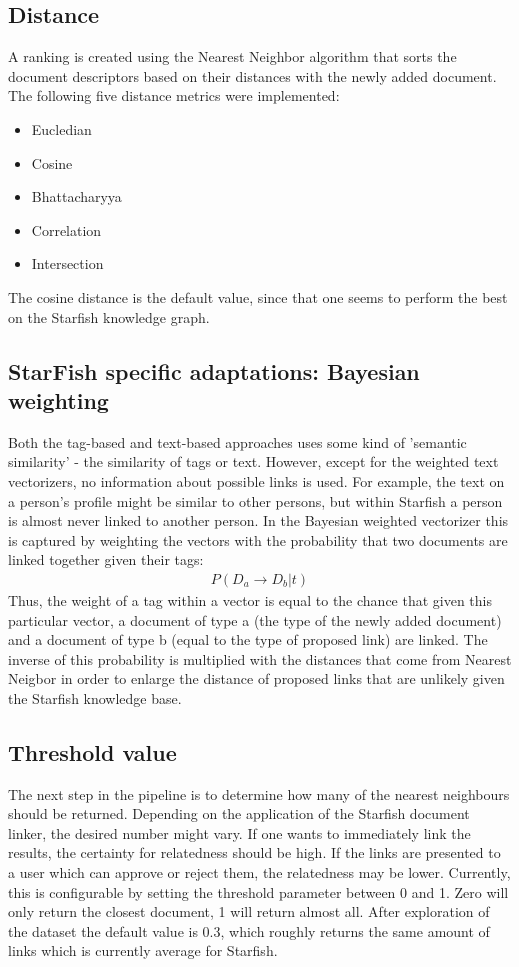 \subsection{Distance}
A ranking is created using the Nearest Neighbor algorithm that sorts the document descriptors based on their distances with the newly added document. The following five distance metrics were implemented: 

\begin{itemize}
\item Eucledian
\item Cosine
\item Bhattacharyya
\item Correlation
\item Intersection
\end{itemize}

The cosine distance is the default value, since that one seems to perform the best on the Starfish knowledge graph. 

\subsection{StarFish specific adaptations: Bayesian weighting}
Both the tag-based and text-based approaches uses some kind of 'semantic similarity' - the similarity of tags or text. However, except for the weighted text vectorizers, no information about possible links is used. For example, the text on a person's profile might be similar to other persons, but within Starfish a person is almost never linked to another person. In the Bayesian weighted vectorizer this is captured by weighting the vectors with the probability that two documents are linked together given their tags:
\begin{align}
\nonumber P(D_a \rightarrow D_b | t)
\end{align}
Thus, the weight of a tag within a vector is equal to the chance that given this particular vector, a document of type a (the type of the newly added document) and a document of type b (equal to the type of proposed link) are linked. The inverse of this probability is multiplied with the distances that come from Nearest Neigbor in order to enlarge the distance of proposed links that are unlikely given the Starfish knowledge base. 

\subsection{Threshold value}
The next step in the pipeline is to determine how many of the nearest neighbours should be returned. Depending on the application of the Starfish document linker, the desired number might vary. If one wants to immediately link the results, the certainty for relatedness should be high. If the links are presented to a user which can approve or reject them, the relatedness may be lower. Currently, this is configurable by setting the threshold parameter between 0 and 1. Zero will only return the closest document, 1 will return almost all. After exploration of the dataset the default value is 0.3, which roughly returns the same amount of links which is currently average for Starfish.

